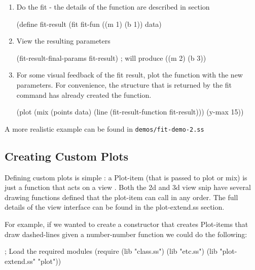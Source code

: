 \documentclass{article}
\begin{document}
{\begin{enumerate}
\item Do the fit - the details of the function are described in  section
\begin{schemedisplay}

(define fit-result 
  (fit 
   fit-fun 
   ((m 1) (b 1)) 
   data)
\end{schemedisplay}

\item View the resulting parameters
\begin{schemedisplay}

(fit-result-final-params fit-result) ; will produce ((m 2) (b 3))         
         
\end{schemedisplay}

\item For some visual feedback of the fit result, plot the function 
         with the new parameters. For convenience, the structure that is returned
         by the fit command has already created the function.
\begin{schemedisplay}

(plot (mix 
        (points data)
        (line (fit-result-function fit-result)))
      (y-max 15))
\end{schemedisplay}

\end{enumerate}

A more realistic example can be found in {\tt demos/fit-demo-2.ss}

\subsection{Creating Custom Plots}


Defining custom plots is simple : a Plot-item (that is passed to plot or mix) is just a function
       that acts on a  {view }. Both the 2d and 3d view snip have several drawing
functions defined that
the plot-item can call in any order. The full details of the view interface can be found in the
 {plot-extend.ss} section. 


For example, if we wanted to create a constructor that creates Plot-items that 
       draw dashed-lines given a number-number function we could do the following:
\begin{schemedisplay}
; Load the required modules
(require (lib "class.ss")
         (lib "etc.ss")
         (lib "plot-extend.ss" "plot"))



\end{schemedisplay}}
\end{document}
